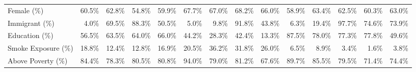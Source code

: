 \documentclass[10pt]{extarticle}
\begin{document}
\begin{table}[ht]
{\begin{tabular}{lrrrrrrrrrrrrr}
Female (\%) & 60.5\% & 62.8\% & 54.8\% & 59.9\% & 67.7\% & 67.0\% & 68.2\% & 66.0\% & 58.9\% & 63.4\% & 62.5\% & 60.3\% & 63.0\% \\
Immigrant (\%) & 4.0\% & 69.5\% & 88.3\% & 50.5\% & 5.0\% & 9.8\% & 91.8\% & 43.8\% & 6.3\% & 19.4\% & 97.7\% & 74.6\% & 73.9\% \\
Education (\%) & 56.5\% & 63.5\% & 64.0\% & 66.0\% & 44.2\% & 28.3\% & 42.4\% & 13.3\% & 87.5\% & 78.0\% & 77.3\% & 77.8\% & 49.6\% \\
Smoke Exposure (\%) & 18.8\% & 12.4\% & 12.8\% & 16.9\% & 20.5\% & 36.2\% & 31.8\% & 26.0\% & 6.5\% & 8.9\% & 3.4\% & 1.6\% & 3.8\% \\
Above Poverty (\%) & 84.4\% & 78.3\% & 80.5\% & 80.8\% & 94.0\% & 79.0\% & 81.2\% & 67.6\% & 89.7\% & 85.5\% & 79.5\% & 71.4\% & 74.4\% \\
\bottomrule
\end{tabular}%
}
\end{table}
\clearpage

\begin{table}[ht]
\centering
\caption{Cumulative Race-Adjusted FVC Difference Explained in UK Biobank. Covariates were added one at a time to a baseline model (age and sex). The race coefficient (mL), percentage of the baseline race difference explained, and model MSE are reported after including each covariate and all preceding ones.}
\footnotesize
\label{tab:explain_fvc_ukb}
\vspace{4pt}
\end{table}
\clearpage
\end{document}

